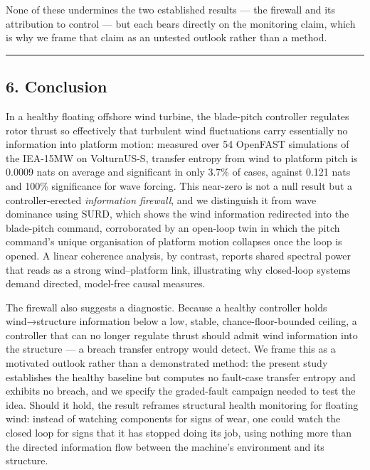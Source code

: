 \documentclass[
  english,
  11pt,
]{article}
\begin{document}
None of these undermines the two established results --- the firewall
and its attribution to control --- but each bears directly on the
monitoring claim, which is why we frame that claim as an untested
outlook rather than a method.

\begin{center}\rule{0.5\linewidth}{0.5pt}\end{center}

\subsection{6. Conclusion}\label{conclusion}

In a healthy floating offshore wind turbine, the blade-pitch controller
regulates rotor thrust so effectively that turbulent wind fluctuations
carry essentially no information into platform motion: measured over 54
OpenFAST simulations of the IEA-15MW on VolturnUS-S, transfer entropy
from wind to platform pitch is 0.0009 nats on average and significant in
only 3.7\% of cases, against 0.121 nats and 100\% significance for wave
forcing. This near-zero is not a null result but a controller-erected
\emph{information firewall}, and we distinguish it from wave dominance
using SURD, which shows the wind information redirected into the
blade-pitch command, corroborated by an open-loop twin in which the
pitch command's unique organisation of platform motion collapses once
the loop is opened. A linear coherence analysis, by contrast, reports
shared spectral power that reads as a strong wind--platform link,
illustrating why closed-loop systems demand directed, model-free causal
measures.

The firewall also suggests a diagnostic. Because a healthy controller
holds wind→structure information below a low, stable,
chance-floor-bounded ceiling, a controller that can no longer regulate
thrust should admit wind information into the structure --- a breach
transfer entropy would detect. We frame this as a motivated outlook
rather than a demonstrated method: the present study establishes the
healthy baseline but computes no fault-case transfer entropy and
exhibits no breach, and we specify the graded-fault campaign needed to
test the idea. Should it hold, the result reframes structural health
monitoring for floating wind: instead of watching components for signs
of wear, one could watch the closed loop for signs that it has stopped
doing its job, using nothing more than the directed information flow
between the machine's environment and its structure.
\end{document}
